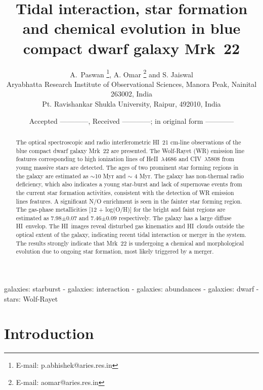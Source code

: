 \documentclass[useAMS,usenatbib]{mn2e}
\title[Blue compact dwarf galaxy Mrk~22]{ Tidal interaction, star formation and chemical evolution in blue compact dwarf galaxy Mrk~22}
\author[A. Paswan, A. Omar and S. Jaiswal]{A.~Paswan \thanks{E-mail:
p.abhishek@aries.res.in}, A. Omar \thanks{E-mail:
aomar@aries.res.in} and S. Jaiswal\\ Aryabhatta Research Institute of Observational Sciences, Manora Peak, Nainital 263002, India\\ Pt. Ravishankar Shukla University, Raipur, 492010, India}
\def\HI{H{\small{I}}~}
\begin{document}
\date{Accepted ------------, Received ------------; in original form ------------}
\pagerange{\pageref{firstpage}--\pageref{lastpage}} \pubyear{}
\maketitle
\label{firstpage}

\begin{abstract}

The optical spectroscopic and radio interferometric \HI 21 cm-line observations of the blue compact dwarf galaxy Mrk~22 are presented. The Wolf-Rayet (WR) emission line features corresponding to high ionization lines of He{\small{II}}~$\lambda$4686 and C{\small{IV}}~$\lambda$5808 from young massive stars are detected. The ages of two prominent star forming regions in the galaxy are estimated as $\sim$10 Myr and $\sim$ 4 Myr. The galaxy has non-thermal radio deficiency, which also indicates a young star-burst and lack of supernovae events from the current star formation activities, consistent with the detection of WR emission lines features. A significant N/O enrichment is seen in the fainter star forming region. The gas-phase metallicities [12 + log(O/H)] for the bright and faint regions are estimated as 7.98$\pm$0.07 and 7.46$\pm$0.09 respectively. The galaxy has a large diffuse \HI envelop. The \HI images reveal disturbed gas kinematics and \HI clouds outside the optical extent of the galaxy, indicating recent tidal interaction or merger in the system. The results strongly indicate that Mrk~22 is undergoing a chemical and morphological evolution due to ongoing star formation, most likely triggered by a merger. 

\end{abstract}

\begin{keywords}
galaxies: starburst - galaxies: interaction - galaxies: abundances - galaxies: dwarf - stars: Wolf-Rayet 
\end{keywords}


\section{Introduction}
\end{document}
